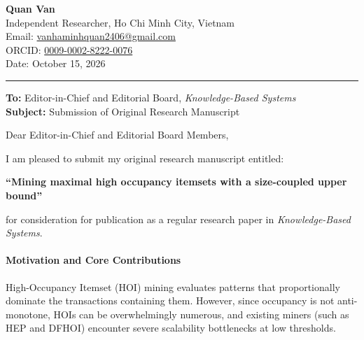 \documentclass[11pt,a4paper]{article}
\begin{document}
\begin{flushleft}
    \textbf{Quan Van} \\
    Independent Researcher, Ho Chi Minh City, Vietnam \\
    Email: \href{mailto:vanhaminhquan2406@gmail.com}{vanhaminhquan2406@gmail.com} \\
    ORCID: \href{https://orcid.org/0009-0002-8222-0076}{0009-0002-8222-0076} \\
    Date: October 15, 2026
\end{flushleft}

\vspace{0.5em}
\hrule
\vspace{1em}

\begin{flushleft}
    \textbf{To:} Editor-in-Chief and Editorial Board, \emph{Knowledge-Based Systems} \\
    \textbf{Subject:} Submission of Original Research Manuscript
\end{flushleft}

\vspace{0.5em}

Dear Editor-in-Chief and Editorial Board Members,

I am pleased to submit my original research manuscript entitled:

\begin{center}
\textbf{``Mining maximal high occupancy itemsets with a size-coupled upper bound''}
\end{center}

for consideration for publication as a regular research paper in \emph{Knowledge-Based Systems}.

\paragraph{Motivation and Core Contributions}
High-Occupancy Itemset (HOI) mining evaluates patterns that proportionally dominate the transactions containing them. However, since occupancy is not anti-monotone, HOIs can be overwhelmingly numerous, and existing miners (such as HEP and DFHOI) encounter severe scalability bottlenecks at low thresholds.
\end{document}

